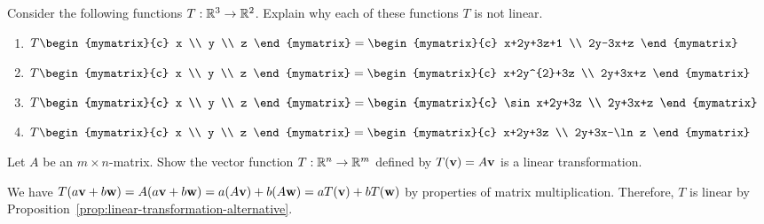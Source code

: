 \begin{ex} Consider the following functions $T:\mathbb{R}^{3}\rightarrow \mathbb{R}^{2}$.
  Explain why each of these functions $T$ is not linear.

  \begin{enumerate}
  \item $T\begin{mymatrix}{c}
      x \\
      y \\
      z
    \end{mymatrix} =\begin{mymatrix}{c}
      x+2y+3z+1 \\
      2y-3x+z
    \end{mymatrix} $

  \item $T\begin{mymatrix}{c}
      x \\
      y \\
      z
    \end{mymatrix} =\begin{mymatrix}{c}
      x+2y^{2}+3z \\
      2y+3x+z
    \end{mymatrix} $

  \item $T\begin{mymatrix}{c}
      x \\
      y \\
      z
    \end{mymatrix} =\begin{mymatrix}{c}
      \sin x+2y+3z \\
      2y+3x+z
    \end{mymatrix} $

  \item $T\begin{mymatrix}{c}
      x \\
      y \\
      z
    \end{mymatrix} =\begin{mymatrix}{c}
      x+2y+3z \\
      2y+3x-\ln z
    \end{mymatrix} $
  \end{enumerate}
\end{ex}

\begin{ex}
  Let $A$ be an $m\times n$-matrix. Show the vector function
  $T:\mathbb{R}^{n}\to \mathbb{R}^{m}$ defined by $T(\vect{v})=A\vect{v}$ is a
  linear transformation.
  \begin{sol}
    We have
    $T(a\vect{v}+b\vect{w}) = A(a\vect{v}+b\vect{w}) = a(A\vect{v}) +
    b(A\vect{w}) = aT(\vect{v}) + bT(\vect{w})$ by properties of
    matrix multiplication. Therefore, $T$ is linear by
    Proposition~\ref{prop:linear-transformation-alternative}.
  \end{sol}
\end{ex}

